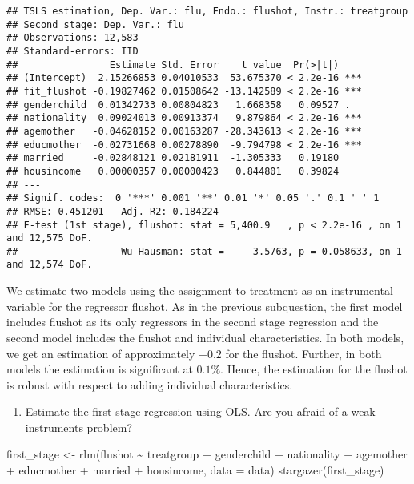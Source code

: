 \documentclass[
]{article}
\newenvironment{Shaded}{\begin{snugshade}}{\end{snugshade}}
\newcommand{\AttributeTok}[1]{\textcolor[rgb]{0.77,0.63,0.00}{#1}}
\newcommand{\FunctionTok}[1]{\textcolor[rgb]{0.00,0.00,0.00}{#1}}
\newcommand{\NormalTok}[1]{#1}
\newcommand{\OtherTok}[1]{\textcolor[rgb]{0.56,0.35,0.01}{#1}}
\newcommand{\SpecialCharTok}[1]{\textcolor[rgb]{0.00,0.00,0.00}{#1}}
\providecommand{\tightlist}{%
  \setlength{\itemsep}{0pt}\setlength{\parskip}{0pt}}
\begin{document}
\begin{verbatim}
## TSLS estimation, Dep. Var.: flu, Endo.: flushot, Instr.: treatgroup
## Second stage: Dep. Var.: flu
## Observations: 12,583 
## Standard-errors: IID 
##                Estimate Std. Error    t value  Pr(>|t|)    
## (Intercept)  2.15266853 0.04010533  53.675370 < 2.2e-16 ***
## fit_flushot -0.19827462 0.01508642 -13.142589 < 2.2e-16 ***
## genderchild  0.01342733 0.00804823   1.668358   0.09527 .  
## nationality  0.09024013 0.00913374   9.879864 < 2.2e-16 ***
## agemother   -0.04628152 0.00163287 -28.343613 < 2.2e-16 ***
## educmother  -0.02731668 0.00278890  -9.794798 < 2.2e-16 ***
## married     -0.02848121 0.02181911  -1.305333   0.19180    
## housincome   0.00000357 0.00000423   0.844801   0.39824    
## ---
## Signif. codes:  0 '***' 0.001 '**' 0.01 '*' 0.05 '.' 0.1 ' ' 1
## RMSE: 0.451201   Adj. R2: 0.184224
## F-test (1st stage), flushot: stat = 5,400.9   , p < 2.2e-16 , on 1 and 12,575 DoF.
##                  Wu-Hausman: stat =     3.5763, p = 0.058633, on 1 and 12,574 DoF.
\end{verbatim}

We estimate two models using the assignment to treatment as an
instrumental variable for the regressor flushot. As in the previous
subquestion, the first model includes flushot as its only regressors in
the second stage regression and the second model includes the flushot
and individual characteristics. In both models, we get an estimation of
approximately \(-0.2\) for the flushot. Further, in both models the
estimation is significant at \(0.1\%\). Hence, the estimation for the
flushot is robust with respect to adding individual characteristics.

\begin{enumerate}
\def\labelenumi{\alph{enumi})}
\setcounter{enumi}{5}
\tightlist
\item
  Estimate the first-stage regression using OLS. Are you afraid of a
  weak instruments problem?
\end{enumerate}

\begin{Shaded}
\begin{Highlighting}[]
\NormalTok{first\_stage }\OtherTok{\textless{}{-}} \FunctionTok{rlm}\NormalTok{(flushot }\SpecialCharTok{\textasciitilde{}}\NormalTok{ treatgroup }\SpecialCharTok{+}\NormalTok{ genderchild }\SpecialCharTok{+}\NormalTok{ nationality }\SpecialCharTok{+}\NormalTok{ agemother }\SpecialCharTok{+}\NormalTok{ educmother }\SpecialCharTok{+}\NormalTok{ married }
                   \SpecialCharTok{+}\NormalTok{ housincome, }\AttributeTok{data =}\NormalTok{ data)}
\FunctionTok{stargazer}\NormalTok{(first\_stage)}
\end{Highlighting}
\end{Shaded}
\end{document}
